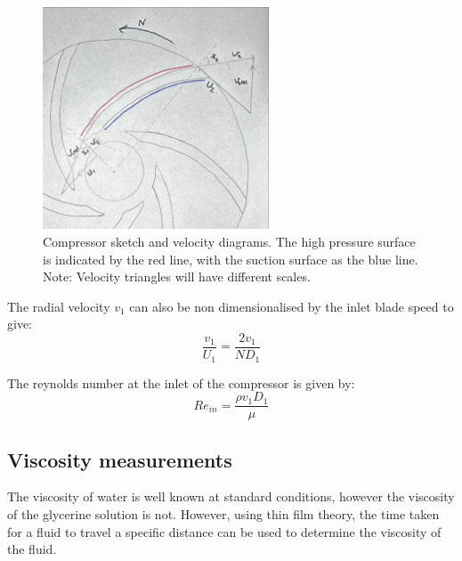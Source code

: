 \documentclass{article}
\begin{document}
\begin{figure}[H]
    \centering
    \includegraphics[width=0.6\textwidth]{velocity_diagrams.jpg}
    \caption{Compressor sketch and velocity diagrams. The high pressure surface is indicated by the red line, with the suction surface as the blue line.
    Note: Velocity triangles will have different scales.}
    \label{fig:vel_diagrams}
\end{figure}

The radial velocity $v_1$ can also be non dimensionalised by the inlet blade speed to give:
\begin{equation}
    \frac{v_1}{U_1} = \frac{2v_1}{N D_1}
\end{equation}


The reynolds number at the inlet of the compressor is given by:
\begin{equation}
    Re_{in} = \frac{\rho v_1 D_1}{\mu}
\end{equation}


\subsection{Viscosity measurements}

The viscosity of water is well known at standard conditions, however the viscosity of the glycerine solution is not.
However, using thin film theory, the time taken for a fluid to travel a specific distance can be used to determine the viscosity of the fluid.
\end{document}
